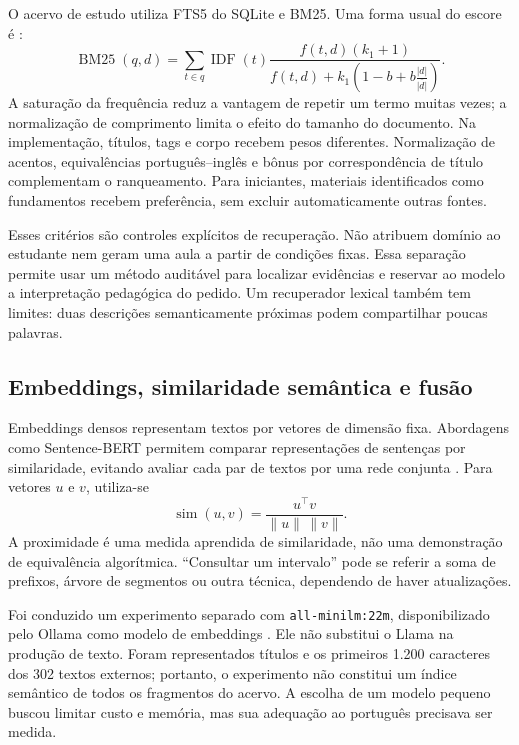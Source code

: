 \documentclass[12pt]{article}
\begin{document}
O acervo de estudo utiliza FTS5 do SQLite e BM25. Uma forma usual do escore é \cite{robertson2009}:
\begin{equation}
 \operatorname{BM25}(q,d)=\sum_{t\in q}\operatorname{IDF}(t)\frac{f(t,d)(k_1+1)}{f(t,d)+k_1\left(1-b+b\frac{|d|}{\overline{|d|}}\right)}.
\end{equation}
A saturação da frequência reduz a vantagem de repetir um termo muitas vezes; a normalização de comprimento limita o efeito do tamanho do documento. Na implementação, títulos, tags e corpo recebem pesos diferentes. Normalização de acentos, equivalências português--inglês e bônus por correspondência de título complementam o ranqueamento. Para iniciantes, materiais identificados como fundamentos recebem preferência, sem excluir automaticamente outras fontes.

Esses critérios são controles explícitos de recuperação. Não atribuem domínio ao estudante nem geram uma aula a partir de condições fixas. Essa separação permite usar um método auditável para localizar evidências e reservar ao modelo a interpretação pedagógica do pedido. Um recuperador lexical também tem limites: duas descrições semanticamente próximas podem compartilhar poucas palavras.

\subsection{Embeddings, similaridade semântica e fusão}
Embeddings densos representam textos por vetores de dimensão fixa. Abordagens como Sentence-BERT permitem comparar representações de sentenças por similaridade, evitando avaliar cada par de textos por uma rede conjunta \cite{reimers2019}. Para vetores $u$ e $v$, utiliza-se
\begin{equation}
 \operatorname{sim}(u,v)=\frac{u^\top v}{\|u\|\,\|v\|}.
\end{equation}
A proximidade é uma medida aprendida de similaridade, não uma demonstração de equivalência algorítmica. ``Consultar um intervalo'' pode se referir a soma de prefixos, árvore de segmentos ou outra técnica, dependendo de haver atualizações.

Foi conduzido um experimento separado com \texttt{all-minilm:22m}, disponibilizado pelo Ollama como modelo de embeddings \cite{ollama2026}. Ele não substitui o Llama na produção de texto. Foram representados títulos e os primeiros 1.200 caracteres dos 302 textos externos; portanto, o experimento não constitui um índice semântico de todos os fragmentos do acervo. A escolha de um modelo pequeno buscou limitar custo e memória, mas sua adequação ao português precisava ser medida.
\end{document}
